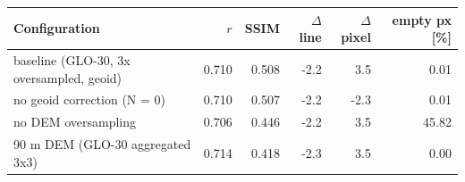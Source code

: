 \begin{tabular}{lrrrrr}\toprule
 Configuration & $r$ & SSIM & $\Delta$line & $\Delta$pixel & empty px [\%]\\\midrule
baseline (GLO-30, 3x oversampled, geoid) & 0.710 & 0.508 & -2.2 & 3.5 & 0.01 \\
no geoid correction (N = 0) & 0.710 & 0.507 & -2.2 & -2.3 & 0.01 \\
no DEM oversampling & 0.706 & 0.446 & -2.2 & 3.5 & 45.82 \\
90 m DEM (GLO-30 aggregated 3x3) & 0.714 & 0.418 & -2.3 & 3.5 & 0.00 \\
\bottomrule\end{tabular}
